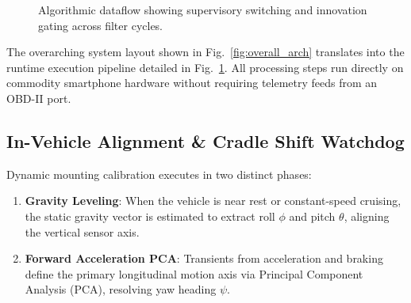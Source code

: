 \documentclass[conference]{IEEEtran}
\begin{document}
\begin{figure}[t]
\centering
{}
\caption{Algorithmic dataflow showing supervisory switching and innovation gating across filter cycles.}
\label{fig:arch}
\end{figure}

The overarching system layout shown in Fig.~\ref{fig:overall_arch} translates into the runtime execution pipeline detailed in Fig.~\ref{fig:arch}. All processing steps run directly on commodity smartphone hardware without requiring telemetry feeds from an OBD-II port.

\subsection{In-Vehicle Alignment \& Cradle Shift Watchdog}

Dynamic mounting calibration executes in two distinct phases:
\begin{enumerate}
\item \textbf{Gravity Leveling}: When the vehicle is near rest or constant-speed cruising, the static gravity vector is estimated to extract roll $\phi$ and pitch $\theta$, aligning the vertical sensor axis.
\item \textbf{Forward Acceleration PCA}: Transients from acceleration and braking define the primary longitudinal motion axis via Principal Component Analysis (PCA), resolving yaw heading $\psi$.
\end{enumerate}
\end{document}
